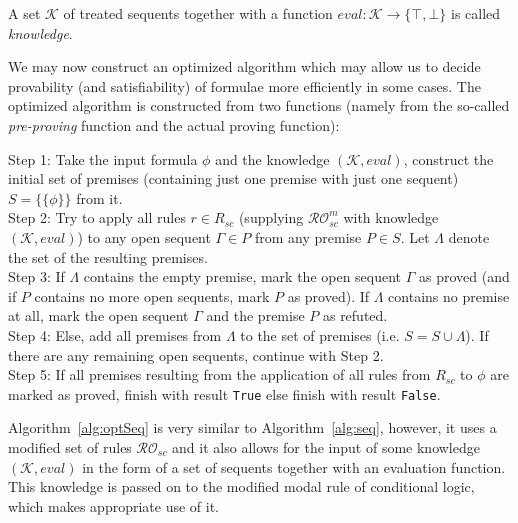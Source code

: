 \documentclass{entcs} \usepackage{entcsmacro}
\begin{document}
\begin{definition}
A set $\mathcal{K}$ of treated sequents together with a function
$eval:\mathcal{K}\rightarrow \{\top,\bot\}$ is called \emph{knowledge}.
\end{definition}

We may now construct an optimized algorithm which may allow us
to decide provability (and satisfiability) of formulae more efficiently
in some cases. The optimized algorithm is constructed from two functions
(namely from the so-called \emph{pre-proving} function and the actual proving
function):

\begin{algorithm}[h]
\begin{alg}
\begin{upshape}
  Step 1: Take the input formula $\phi$ and the knowledge $(\mathcal{K},eval)$,
  construct the initial set of premises (containing just one premise with just
  one sequent) $S = \{\{\phi\}\}$ from it.\\
  Step 2: Try to apply all rules $r\in R_{sc}$ (supplying $\mathcal{RO}^m_{sc}$
  with knowledge $(\mathcal{K},eval)$) to any open sequent
  $\Gamma\in P$ from any premise $P\in S$. Let $\Lambda$ denote the set
  of the resulting premises.\\
  Step 3: If $\Lambda$ contains the empty premise, mark the open
  sequent $\Gamma$ as proved (and if $P$ contains no more open
  sequents, mark $P$ as proved). If $\Lambda$ contains no premise at
  all, mark the open sequent $\Gamma$ and the premise $P$ as refuted.\\
  Step 4: Else, add all premises from $\Lambda$ to the set of
  premises (i.e. $S=S\cup\Lambda$). If there are any remaining open
  sequents, continue with Step 2.\\
  Step 5: If all premises resulting from the application of all rules
  from $R_{sc}$ to $\phi$ are marked as proved, finish with result \verb|True|
  else finish with result \verb|False|.
\end{upshape}
\label{alg:optSeq}
\end{alg}
\end{algorithm}

Algorithm~\ref{alg:optSeq} is very similar to Algorithm~\ref{alg:seq},
however, it uses a modified
set of rules $\mathcal{RO}_{sc}$ and it also allows for the
input of some knowledge $(\mathcal{K},eval)$ in the form of a set of sequents
together with an evaluation function. This knowledge is passed on to
the modified modal rule of conditional logic, which makes appropriate use of it.
\end{document}
